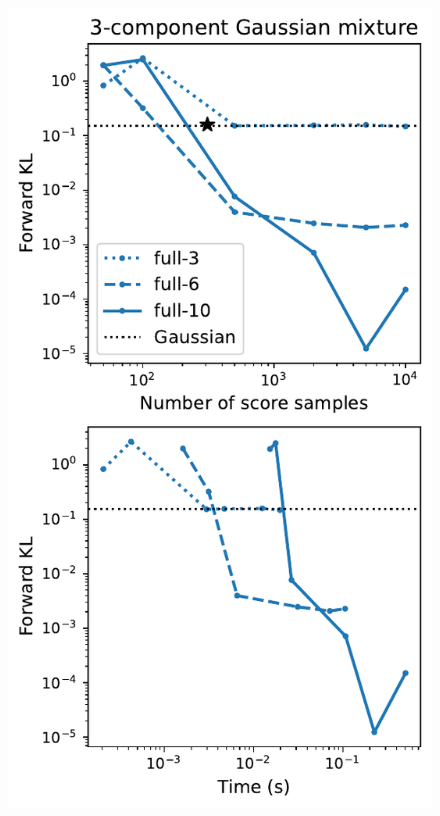 \begin{figure}[t]
    \centering
    \includegraphics[scale=0.42]{figs/expts-2d/metrics-3gmm_full.pdf}

\end{figure}
